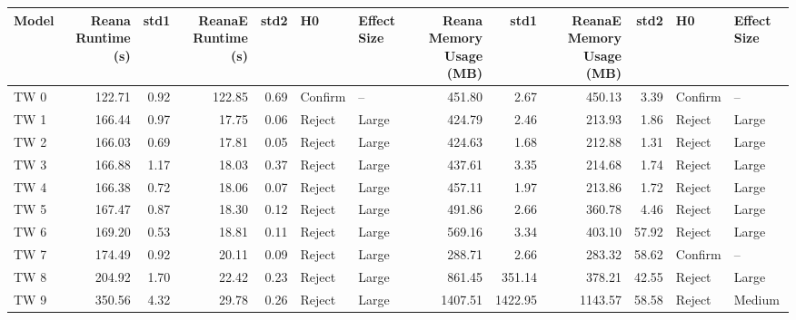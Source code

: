 \begin{tabular}{lrrrrllrrrrll}
\toprule
Model &  Reana Runtime (s) &  std1 &  ReanaE Runtime (s) &  std2 &       H0 & Effect Size &  Reana Memory Usage (MB) &     std1 &  ReanaE Memory Usage (MB) &   std2 &       H0 & Effect Size \\
\midrule
 TW 0 &             122.71 &  0.92 &              122.85 &  0.69 &  Confirm &          -- &                   451.80 &     2.67 &                    450.13 &   3.39 &  Confirm &          -- \\
 TW 1 &             166.44 &  0.97 &               17.75 &  0.06 &   Reject &       Large &                   424.79 &     2.46 &                    213.93 &   1.86 &   Reject &       Large \\
 TW 2 &             166.03 &  0.69 &               17.81 &  0.05 &   Reject &       Large &                   424.63 &     1.68 &                    212.88 &   1.31 &   Reject &       Large \\
 TW 3 &             166.88 &  1.17 &               18.03 &  0.37 &   Reject &       Large &                   437.61 &     3.35 &                    214.68 &   1.74 &   Reject &       Large \\
 TW 4 &             166.38 &  0.72 &               18.06 &  0.07 &   Reject &       Large &                   457.11 &     1.97 &                    213.86 &   1.72 &   Reject &       Large \\
 TW 5 &             167.47 &  0.87 &               18.30 &  0.12 &   Reject &       Large &                   491.86 &     2.66 &                    360.78 &   4.46 &   Reject &       Large \\
 TW 6 &             169.20 &  0.53 &               18.81 &  0.11 &   Reject &       Large &                   569.16 &     3.34 &                    403.10 &  57.92 &   Reject &       Large \\
 TW 7 &             174.49 &  0.92 &               20.11 &  0.09 &   Reject &       Large &                   288.71 &     2.66 &                    283.32 &  58.62 &  Confirm &          -- \\
 TW 8 &             204.92 &  1.70 &               22.42 &  0.23 &   Reject &       Large &                   861.45 &   351.14 &                    378.21 &  42.55 &   Reject &       Large \\
 TW 9 &             350.56 &  4.32 &               29.78 &  0.26 &   Reject &       Large &                  1407.51 &  1422.95 &                   1143.57 &  58.58 &   Reject &      Medium \\
\bottomrule
\end{tabular}
